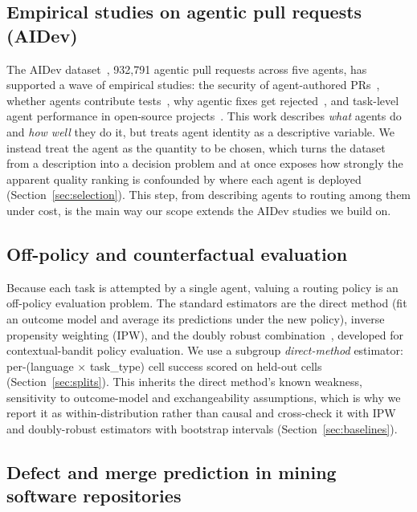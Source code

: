 \documentclass[sigconf,nonacm]{acmart}
\begin{document}
\subsection{Empirical studies on agentic pull requests (AIDev)}

The AIDev dataset~\cite{li2026aidev}, 932,791 agentic pull requests across five agents, has supported a wave of empirical studies: the security of agent-authored PRs~\cite{security2026teammates}, whether agents contribute tests~\cite{haque2026tests}, why agentic fixes get rejected~\cite{rejection2026fixes}, and task-level agent performance in open-source projects~\cite{tasklevel2026eval}. This work describes \emph{what} agents do and \emph{how well} they do it, but treats agent identity as a descriptive variable. We instead treat the agent as the quantity to be chosen, which turns the dataset from a description into a decision problem and at once exposes how strongly the apparent quality ranking is confounded by where each agent is deployed (Section~\ref{sec:selection}). This step, from describing agents to routing among them under cost, is the main way our scope extends the AIDev studies we build on.

\subsection{Off-policy and counterfactual evaluation}

Because each task is attempted by a single agent, valuing a routing policy is an off-policy evaluation problem. The standard estimators are the direct method (fit an outcome model and average its predictions under the new policy), inverse propensity weighting (IPW), and the doubly robust combination~\cite{dudik2011doubly}, developed for contextual-bandit policy evaluation. We use a subgroup \emph{direct-method} estimator: per-(language $\times$ task\_type) cell success scored on held-out cells (Section~\ref{sec:splits}). This inherits the direct method's known weakness, sensitivity to outcome-model and exchangeability assumptions, which is why we report it as within-distribution rather than causal and cross-check it with IPW and doubly-robust estimators with bootstrap intervals (Section~\ref{sec:baselines}).

\subsection{Defect and merge prediction in mining software repositories}
\end{document}

